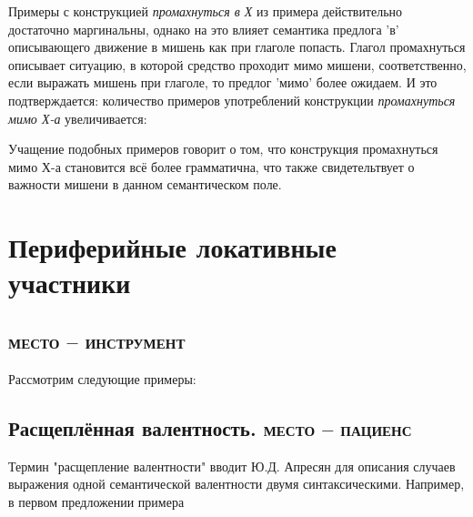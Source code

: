 
Примеры с конструкцией \textit{промахнуться в Х} из примера  действительно достаточно маргинальны, однако на это влияет семантика предлога 'в' описывающего движение в мишень как при глаголе попасть. Глагол промахнуться описывает ситуацию, в которой средство проходит мимо мишени, соответственно, если выражать мишень при глаголе, то предлог 'мимо' более ожидаем. И это подтверждается: количество примеров употреблений конструкции \textit{промахнуться мимо Х-а} увеличивается:




Учащение подобных примеров говорит о том, что конструкция промахнуться мимо Х-а становится всё более грамматична, что также свидетельтвует о важности мишени в данном семантическом поле.

\section{Периферийные локативные участники}
\subsection{\textsc{место -- инструмент}}
Рассмотрим следующие примеры:


\subsection{Расщеплённая валентность. \textsc{место -- пациенс}}
Термин "расщепление валентности" вводит Ю.Д. Апресян \citep[153]{апресян1995избранные} для описания случаев выражения одной семантической валентности двумя синтаксическими. Например, в первом предложении примера  

